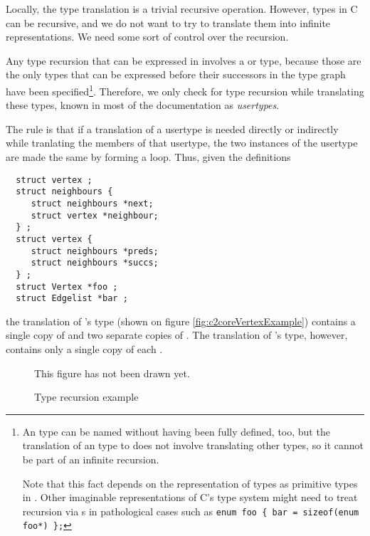 \begin{docpart}
Locally, the type translation is a trivial recursive operation.
However, types
in C can be recursive, and we do not want to try to translate
them into infinite \coreC representations. We need some sort
of control over the recursion.

Any type recursion that can be expressed in \ansiC involves
a  or  type, because
those are the only types that can be expressed before their successors
in the type graph have been specified\footnote
        {An  type can be named without having been fully
        defined, too, but the translation of an  type to
        \coreC does not involve translating other types, so it cannot
        be part of an infinite recursion.

        Note that this fact depends on the representation of 
        types as primitive types in \coreC. Other imaginable
        representations of C's type system might need to treat
        recursion via s in pathological cases such as
        \texttt{enum foo \{ bar = sizeof(enum foo*) \};}}.
Therefore, we only check for type recursion while translating
these types, known in most of the \cmix documentation as
\emph{usertypes}.

The rule is that if a translation of a usertype is needed directly or
indirectly while tranlating the members of that usertype, the two
instances of the usertype are made the same by forming a loop.
Thus, given the definitions
\begin{verbatim}
  struct vertex ;
  struct neighbours {
     struct neighbours *next;
     struct vertex *neighbour;
  } ;
  struct vertex {
     struct neighbours *preds;
     struct neighbours *succs;
  } ;
  struct Vertex *foo ;
  struct Edgelist *bar ;
\end{verbatim}
the translation of 's type (shown on figure
\vref{fig:c2coreVertexExample}) contains a single copy
of  and two separate copies of
. The translation of 's type,
however, contains only a single copy of each .

\begin{figure}[htbp]
  \begin{frameit}
  \begin{center}
        This figure has not been drawn yet.
  \end{center}
  \end{frameit}
  \caption{Type recursion example}
  \label{fig:c2coreVertexExample}
\end{figure}


\end{docpart}
